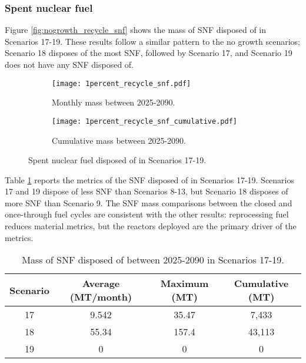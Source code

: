 \subsubsection{Spent nuclear fuel}
Figure \ref{fig:nogrowth_recycle_snf} shows the mass of \gls{SNF} 
disposed of in Scenarios 17-19. These results follow a similar 
pattern to the no growth scenarios; Scenario 18 disposes of 
the most \gls{SNF}, followed by Scenario 17, and Scenario 
19 does not have any \gls{SNF} disposed of. 

\begin{figure}[h!]
    \centering
    \begin{subfigure}[b]{0.49\textwidth}
        \centering
        \texttt{[image: 1percent\_recycle\_snf.pdf]}
        \caption{Monthly mass between 2025-2090.}
        \label{fig:1percent_recycle_snf_all}
    \end{subfigure}
    \hfill
    \begin{subfigure}[b]{0.49\textwidth}
        \centering
        \texttt{[image: 1percent\_recycle\_snf\_cumulative.pdf]}
        \caption{Cumulative mass between 2025-2090.}
        \label{fig:1percent_recycle_snf_cumulative}
    \end{subfigure}
       \caption{Spent nuclear fuel disposed of in Scenarios 17-19.}
       \label{fig:1percent_recycle_snf}
\end{figure}

Table \ref{tab:s17-19_snf} reports the metrics of the \gls{SNF} 
disposed of in Scenarios 17-19. Scenarios 17 and 19 dispose of 
less \gls{SNF} than Scenarios 8-13, but Scenario 18 disposes of 
more \gls{SNF} than Scenario 9. The \gls{SNF} mass comparisons 
between the closed and once-through fuel cycles are consistent 
with the other results: reprocessing fuel reduces material metrics, 
but the reactors deployed are the primary driver of the metrics. 

\begin{table}[h!]
    \centering 
    \caption{Mass of SNF disposed of between 2025-2090 in 
    Scenarios 17-19.}
    \label{tab:s17-19_snf}
    \begin{tabular}{c c c c}
        \hline 
        Scenario & Average (MT/month) & Maximum (MT) & Cumulative (MT) \\
        \hline
        17 & 9.542 & 35.47 & 7,433\\
        18 & 55.34 & 157.4 & 43,113\\
        19 & 0 & 0 & 0 \\
        \hline
    \end{tabular}
\end{table}


